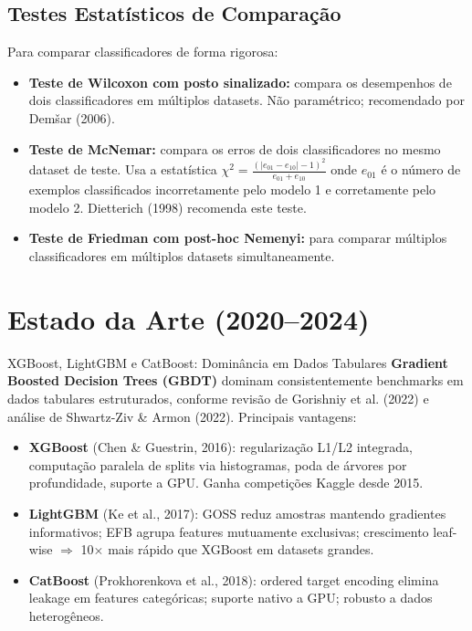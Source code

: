 \documentclass[12pt,a4paper]{article}
\begin{document}
\subsection{Testes Estatísticos de Comparação}

Para comparar classificadores de forma rigorosa:

\begin{itemize}
  \item \textbf{Teste de Wilcoxon com posto sinalizado:} compara os desempenhos de dois classificadores em múltiplos datasets. Não paramétrico; recomendado por Demšar (2006).
  \item \textbf{Teste de McNemar:} compara os erros de dois classificadores no mesmo dataset de teste. Usa a estatística $\chi^2 = \frac{(|e_{01} - e_{10}| - 1)^2}{e_{01} + e_{10}}$ onde $e_{01}$ é o número de exemplos classificados incorretamente pelo modelo 1 e corretamente pelo modelo 2. Dietterich (1998) recomenda este teste.
  \item \textbf{Teste de Friedman com post-hoc Nemenyi:} para comparar múltiplos classificadores em múltiplos datasets simultaneamente.
\end{itemize}

\section{Estado da Arte (2020--2024)}

\begin{estadoartebox}{XGBoost, LightGBM e CatBoost: Dominância em Dados Tabulares}
\textbf{Gradient Boosted Decision Trees (GBDT)} dominam consistentemente benchmarks em dados tabulares estruturados, conforme revisão de Gorishniy et al. (2022) e análise de Shwartz-Ziv \& Armon (2022). Principais vantagens:

\begin{itemize}
  \item \textbf{XGBoost} (Chen \& Guestrin, 2016): regularização L1/L2 integrada, computação paralela de splits via histogramas, poda de árvores por profundidade, suporte a GPU. Ganha competições Kaggle desde 2015.
  \item \textbf{LightGBM} (Ke et al., 2017): GOSS reduz amostras mantendo gradientes informativos; EFB agrupa features mutuamente exclusivas; crescimento leaf-wise $\Rightarrow$ 10$\times$ mais rápido que XGBoost em datasets grandes.
  \item \textbf{CatBoost} (Prokhorenkova et al., 2018): ordered target encoding elimina leakage em features categóricas; suporte nativo a GPU; robusto a dados heterogêneos.
\end{itemize}
\end{estadoartebox}
\end{document}
